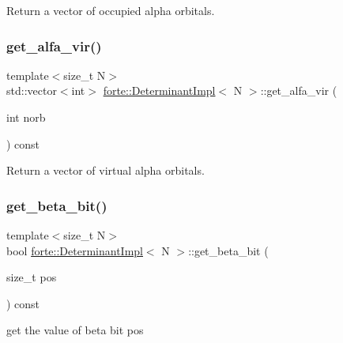 Return a vector of occupied alpha orbitals. 

\mbox{\label{classforte_1_1_determinant_impl_a1dc3bb02e9944e3c83d98052c91fe44c}} 
\subsubsection{\texorpdfstring{get\+\_\+alfa\+\_\+vir()}{get\_alfa\_vir()}}
{\footnotesize\ttfamily template$<$size\+\_\+t N$>$ \\
std\+::vector$<$int$>$ \mbox{\hyperlink{classforte_1_1_determinant_impl}{forte\+::\+Determinant\+Impl}}$<$ N $>$\+::get\+\_\+alfa\+\_\+vir (\begin{DoxyParamCaption}\item[{int}]{norb }\end{DoxyParamCaption}) const\hspace{0.3cm}{\ttfamily [inline]}}



Return a vector of virtual alpha orbitals. 

\mbox{\label{classforte_1_1_determinant_impl_a7105d98744e76588e9db2797e12c8406}} 
\subsubsection{\texorpdfstring{get\+\_\+beta\+\_\+bit()}{get\_beta\_bit()}}
{\footnotesize\ttfamily template$<$size\+\_\+t N$>$ \\
bool \mbox{\hyperlink{classforte_1_1_determinant_impl}{forte\+::\+Determinant\+Impl}}$<$ N $>$\+::get\+\_\+beta\+\_\+bit (\begin{DoxyParamCaption}\item[{size\+\_\+t}]{pos }\end{DoxyParamCaption}) const\hspace{0.3cm}{\ttfamily [inline]}}



get the value of beta bit pos 

